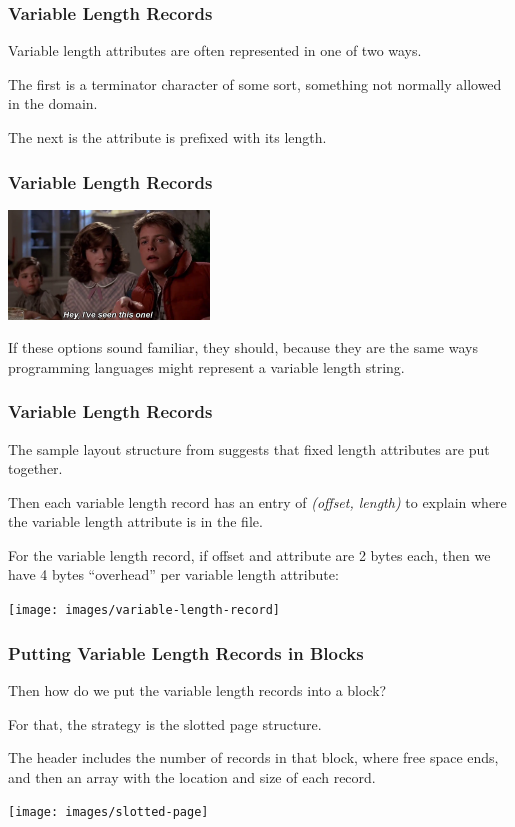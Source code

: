 \begin{frame}
\frametitle{Variable Length Records}

Variable length attributes are often represented in one of two ways. 

The first is a terminator character of some sort, something not normally allowed in the domain. 

The next is the attribute is prefixed with its length. 

\end{frame}


\begin{frame}
\frametitle{Variable Length Records}

\begin{center}
	\includegraphics[width=0.4\textwidth]{images/seenthisone.png}
\end{center}

If these options sound familiar, they should, because they are the same ways programming languages might represent a variable length string.


\end{frame}


\begin{frame}
\frametitle{Variable Length Records}

The sample layout structure from suggests that fixed length attributes are put together. 

Then each variable length record has an entry of \textit{(offset, length)}  to explain where the variable length attribute is in the file. 

For the variable length record, if offset and attribute are 2 bytes each, then we have 4 bytes ``overhead'' per variable length attribute:

\begin{center}
\texttt{[image: images/variable-length-record]}
\end{center}

\end{frame}


\begin{frame}
\frametitle{Putting Variable Length Records in Blocks}
Then how do we put the variable length records into a block? 

For that, the strategy is the \alert{slotted page structure}.

The header includes the number of records in that block, where free space ends, and then an array with the location and size of each record.

\begin{center}
\texttt{[image: images/slotted-page]}
\end{center}

\end{frame}



